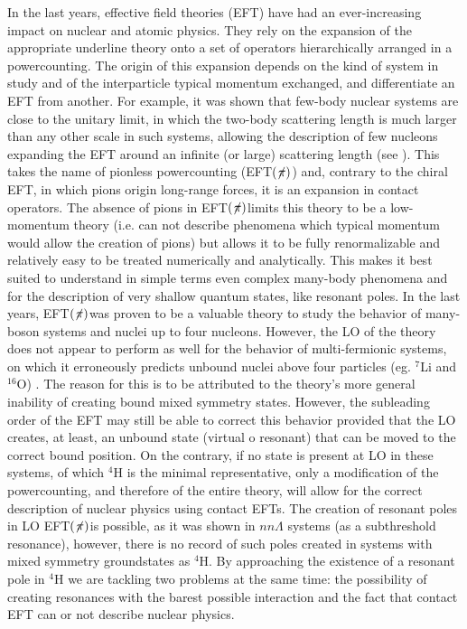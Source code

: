 \documentclass[aps,onecolumn,preprintnumbers,amsmath,amssymb,nofootinbib,superscriptaddress,notitlepage]{revtex4-1}
\newcommand{\eftnopi}{\mbox{EFT$(\not \! \pi)$}}
\begin{document}
%
In the last years, effective field theories (EFT) have had an ever-increasing impact on nuclear and atomic physics. 
They rely on the expansion of the appropriate underline theory onto a set of operators hierarchically arranged in a powercounting. 
The origin of this expansion depends on the kind of system in study and of the interparticle typical momentum exchanged, and differentiate an EFT from another. 
For example, it was shown that few-body nuclear systems are close to the unitary limit, in which the two-body scattering length is much larger than any other scale in such systems, allowing the description of few nucleons expanding the EFT around an infinite (or large) scattering length (see \cite{vanKolck:1999mw}).
This takes the name of pionless powercounting (\eftnopi) and, contrary to the chiral EFT, in which pions origin long-range forces, it is an expansion in contact operators.
The absence of pions in \eftnopi limits this theory to be a low-momentum theory (i.e. can not describe phenomena which typical momentum would allow the creation of pions) but allows it to be fully renormalizable and relatively easy to be treated numerically and analytically.
This makes it best suited to understand in simple terms even complex many-body phenomena and for the description of very shallow quantum states, like resonant poles. 
In the last years, \eftnopi was proven to be a valuable theory to study the behavior of many-boson systems and nuclei up to four nucleons. 
However, the LO of the theory does not appear to perform as well for the behavior of multi-fermionic systems, on which it erroneously predicts unbound nuclei above four particles (eg. $^7$Li and $^{16}$O) \cite{Schafer:2020ivj,Contessi:2017rww}.
The reason for this is to be attributed to the theory's more general inability of creating bound mixed symmetry states.
However, the subleading order of the EFT may still be able to correct this behavior provided that the LO creates, at least, an unbound state (virtual o resonant) that can be moved to the correct bound position. 
On the contrary, if no state is present at LO in these systems, of which $^4$H is the minimal representative, only a modification of the powercounting, and therefore of the entire theory, will allow for the correct description of nuclear physics using contact EFTs.
The creation of resonant poles in LO \eftnopi is possible, as it was shown in $nn\Lambda$ systems \cite{Schafer:2020rba} (as a subthreshold resonance), however, there is no record of such poles created in systems with mixed symmetry groundstates as $^4$H. 
By approaching the existence of a resonant pole in $^4$H we are tackling two problems at the same time: the possibility of creating resonances with the barest possible interaction and the fact that contact EFT can or not describe nuclear physics.
%
\end{document}

